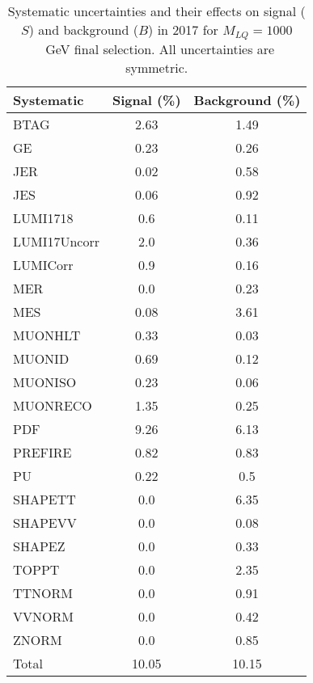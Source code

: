 \begin{table}[htbp]
\begin{center}
\caption{Systematic uncertainties and their effects on signal ($S$) and background ($B$) in 2017 for $M_{LQ}=1000$~GeV final selection. All uncertainties are symmetric.}
\begin{tabular}{lcc}
\hline\hline
Systematic & Signal (\%) & Background (\%) \\ \hline 
BTAG & 2.63 & 1.49\\ 
GE & 0.23 & 0.26\\ 
JER & 0.02 & 0.58\\ 
JES & 0.06 & 0.92\\ 
LUMI1718 & 0.6 & 0.11\\ 
LUMI17Uncorr & 2.0 & 0.36\\ 
LUMICorr & 0.9 & 0.16\\ 
MER & 0.0 & 0.23\\ 
MES & 0.08 & 3.61\\ 
MUONHLT & 0.33 & 0.03\\ 
MUONID & 0.69 & 0.12\\ 
MUONISO & 0.23 & 0.06\\ 
MUONRECO & 1.35 & 0.25\\ 
PDF & 9.26 & 6.13\\ 
PREFIRE & 0.82 & 0.83\\ 
PU & 0.22 & 0.5\\ 
SHAPETT & 0.0 & 6.35\\ 
SHAPEVV & 0.0 & 0.08\\ 
SHAPEZ & 0.0 & 0.33\\ 
TOPPT & 0.0 & 2.35\\ 
TTNORM & 0.0 & 0.91\\ 
VVNORM & 0.0 & 0.42\\ 
ZNORM & 0.0 & 0.85\\ 
Total & 10.05 & 10.15\\ \hline \hline
\end{tabular}
\label{tab:SysUncertainties_uujj_1000}
\end{center}
\end{table}

